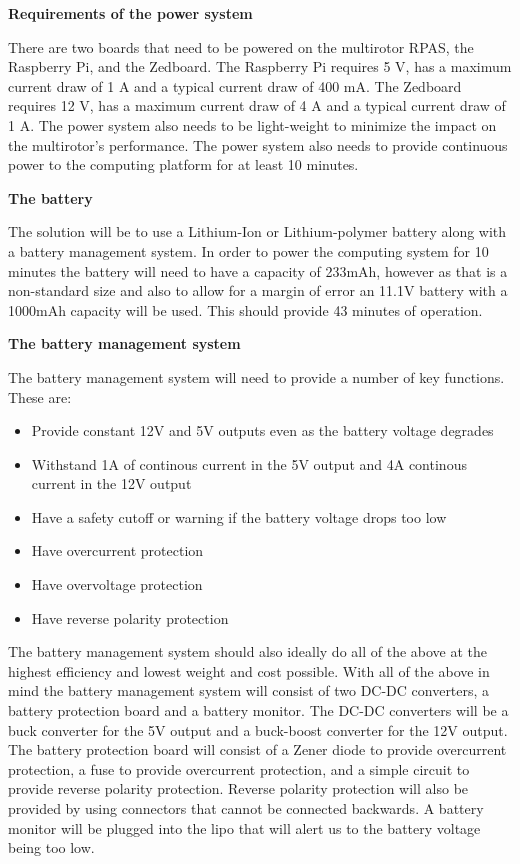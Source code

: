 \textbf{Requirements of the power system}

 There are two boards that need to be powered on the multirotor RPAS, the Raspberry Pi, and the Zedboard. The Raspberry Pi requires
5 V, has a maximum current draw of 1 A and a typical current draw of 400 mA. The Zedboard requires 12 V, has a maximum current draw of
4 A and a typical current draw of 1 A. The power system also
needs to be light-weight to minimize the impact on the multirotor's performance. The power system also needs to provide continuous power to the computing platform for at least 10 minutes.

\textbf{The battery}

The solution will be to use a Lithium-Ion or Lithium-polymer battery along with a battery management system. In order to
power the computing system for 10 minutes the battery will need to have a capacity of 233mAh, however as that is a non-standard size and also to allow for a margin of error an 11.1V battery with a 1000mAh capacity will be used. This should provide 43 minutes of operation.

\textbf{The battery management system}

The battery management system will need to provide a number of key functions. These are:
  
  \begin{itemize}
\item Provide constant 12V and 5V outputs even as the battery voltage degrades
\item Withstand 1A of continous current in the 5V output and 4A continous current in the 12V output
\item Have a safety cutoff or warning if the battery voltage drops too low
\item Have overcurrent protection
\item Have overvoltage protection
\item Have reverse polarity protection
\end{itemize}
 
The battery management system should also ideally do all of the above at the highest efficiency and lowest weight and cost possible. With all of the above in mind the battery management system will consist of two DC-DC converters, a battery protection board and a battery monitor. The DC-DC converters will be a buck converter for the 5V output and a buck-boost converter for the 12V output. The battery protection board will consist of a Zener diode to provide overcurrent protection, a fuse to provide overcurrent protection, and a simple circuit to provide reverse polarity protection. Reverse polarity protection will also be provided by using connectors that cannot be connected backwards. A battery monitor will be plugged into the lipo that will alert us to the battery voltage being too low.

